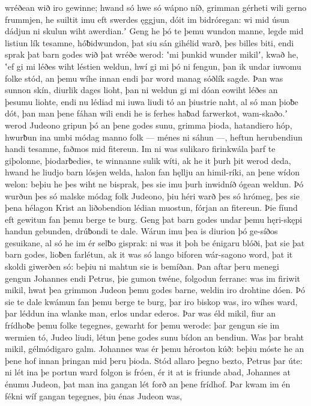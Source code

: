 wréðean wið iro gewinne; hwand só hwe só wápno níð,
grimman gérheti wili gerno frummjen,
he suiltit imu eft swerdes ęggjun,
dóit im bidróregan: wi mid úsun dádjun ni skulun
wiht awerdian.ʼ Geng he þó te þemu wundon manne,
legde mid listiun lík tesamne,
hóƀidwundon, þat siu sán gihélid warð,
þes billes biti, endi sprak þat barn godes
wið þat wréðe werod: ʽmi þunkid wunder mikilʼ, kwað he,
ʽef gi mi léðes wiht léstien weldun,
hwí gi mi þó ni fengun, þan ik undar iuwomu folke stód,
an þemu wíhe innan endi þar word manag
sóðlík sagde. Þan was sunnon skín,
diurlik dages lioht, þan ni weldun gi mi dóan eowiht
léðes an þesumu liohte, endi nu lédiad mi iuwa liudi tó
an þiustrie naht, al só man þioƀe dót,
þan man þene fáhan wili endi he is ferhes haƀad
farwerkot, wam-skaðo.ʼ werod Judeono
gripun þó an þene godes sunu, grimma þioda,
hatandiero hóp, hwurƀun ina umbi
módag manno folk — ménes ni sáhun —,
heftun herubendiun handi tesamne,
faðmos mid fitereun. Im ni was sulikaro firinkwála
þarf te giþolonne, þiodarƀedies,
te winnanne sulik wíti, ak he it þurh þit werod deda,
hwand he liudjo barn lósjen welda,
halon fan hęllju an himil-ríki,
an þene wídon welon: beþiu he þes wiht ne bisprak,
þes sie imu þurh inwidníð ógean weldun.
Þó wurðun þes só malske módag folk Judeono,
þiu héri warð þes só hrómeg, þes sie þena hélagon Krist
an liðobendion lédian muostun,
fórjan an fitereun. Þie fíund eft gewitun
fan þemu berge te burg. Geng þat barn godes
undar þemu hęri-skępi handun gebunden,
drúƀondi te dale. Wárun imu þea is diurion þó
ge-síðos gesuikane, al só he im ér selƀo gisprak:
ni was it þoh be énigaru blóði, þat sie þat barn godes,
lioƀen farlétun, ak it was só lango biforen
wár-sagono word, þat it skoldi giwerðen só:
beþiu ni mahtun sie is bemíðan. Þan aftar þeru menegi gengun
Johannes endi Petrus, þie gumon twéne,
folgodun ferrane: was im firiwit mikil,
hwat þea grimmon Judeon þemu godes barne,
weldin iro drohtine dóen. Þó sie te dale kwámun
fan þemu berge te burg, þar iro biskop was,
iro wíhes ward, þar léddun ina wlanke man,
erlos undar ederos. Þar was éld mikil,
fiur an frídhoƀe þemu folke tegegnes,
gewarht for þemu werode: þar gengun sie im wermien tó,
Judeo liudi, létun þene godes sunu
bídon an bendiun. Was þar braht mikil,
gélmódigaro galm. Johannes was ér
þemu héroston kúð: beþiu móste he an þene hof innan
þringan mid þeru þioda. Stód allaro þegno bezto,
Petrus þar úte: ni lét ina þe portun ward
folgon is fróen, ér it at is friunde abad,
Johannes at énumu Judeon, þat man ina gangan lét
forð an þene frídhof. Þar kwam im én fékni wíf
gangan tegegnes, þiu énas Judeon was,
